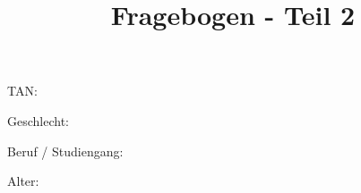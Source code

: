 \documentclass[10pt,a4paper]{scrartcl}
\title{Fragebogen - Teil 2}
\date{\vspace{-5ex}}
\begin{document}
\maketitle
\pagestyle{empty}

\vspace{2 cm}

TAN: \dotfill\\

\vspace{2 cm}

Geschlecht: \dotfill\\

\vspace{2 cm}

Beruf / Studiengang: \dotfill\\

\vspace{2 cm}

Alter: \dotfill\\
\end{document}
